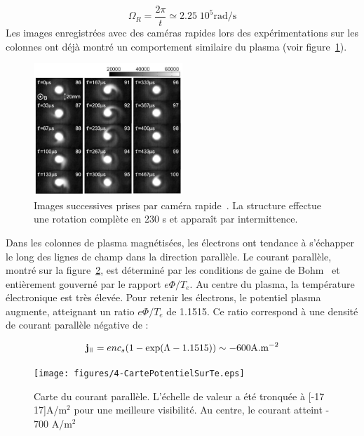 \begin{refsection}
\begin{equation}
\Omega_R=\frac{2\pi}{t}\simeq2.25\;10^5\text{rad/s}
\end{equation}
Les images enregistrées avec des caméras rapides lors des expérimentations
sur les colonnes ont déjà montré un
comportement similaire du plasma (voir figure~\ref{4-CybeleNagdis}). 

\begin{figure}[!htbp]
\centering
\includegraphics[width=0.5\textwidth]{figures/4-CybeleNAGDIS.png}
\caption{Images successives prises par caméra rapide~\parencite{NagdisCamera}.
La structure effectue une rotation complète en 230 \micro s et apparaît par
intermittence.
\label{4-CybeleNagdis}}
\end{figure}

Dans les colonnes de plasma magnétisées, les électrons ont tendance à s'échapper
le long des lignes de champ dans la direction parallèle. Le courant parallèle,
montré sur la figure~\ref{4-cybeleCartePotentielSurTe}, est déterminé par les
conditions de gaine de Bohm~\parencite{Stangeby} et entièrement gouverné par le
rapport $e\Phi/T_e$. Au centre du plasma, la température électronique est très
élevée. Pour retenir les électrons, le potentiel plasma augmente, atteignant un
ratio $e\Phi/T_e$ de 1.1515. Ce ratio correspond à une densité de courant
parallèle négative de :

\begin{equation}
\mathbf j_\para=enc_s(1-\exp(\Lambda-1.1515))\sim -600\text{A.m}\puissance{-2}
\end{equation}

\begin{figure}[!htbp]
  \centering
    \texttt{[image: figures/4-CartePotentielSurTe.eps]}
    \caption{Carte du courant parallèle.
    L'échelle de valeur a été tronquée à
    [-17 17]A/m$^2$ pour une meilleure
    visibilité. Au centre, le courant atteint
    - 700 A/m$^2$\label{4-cybeleCartePotentielSurTe}}
\end{figure}


\end{refsection}
